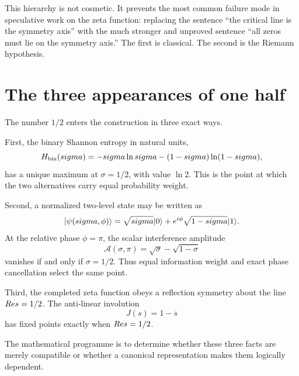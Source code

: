 This hierarchy is not cosmetic. It prevents the most common failure mode in speculative work on the zeta function: replacing the sentence ``the critical line is the symmetry axis'' with the much stronger and unproved sentence ``all zeros must lie on the symmetry axis.'' The first is classical. The second is the Riemann hypothesis.

\section{The three appearances of one half}
The number $1/2$ enters the construction in three exact ways.

First, the binary Shannon entropy in natural units,
\begin{equation}
H_{\mathrm{bin}}(sigma)=-sigma\ln sigma-(1-sigma)\ln(1-sigma),
\end{equation}
has a unique maximum at $\sigma=1/2$, with value $\ln2$. This is the point at which the two alternatives carry equal probability weight.

Second, a normalized two-level state may be written as
\begin{equation}
\lvert \psi(sigma,\phi)\rangle
=\sqrt{sigma}\lvert 0\rangle+e^{i\phi}\sqrt{1-sigma}\lvert 1\rangle.
\end{equation}
At the relative phase $\phi=\pi$, the scalar interference amplitude
\begin{equation}
\mathcal A(\sigma,\pi)=\sqrt{\sigma}-\sqrt{1-\sigma}
\end{equation}
vanishes if and only if $\sigma=1/2$. Thus equal information weight and exact phase cancellation select the same point.

Third, the completed zeta function obeys a reflection symmetry about the line $Re s=1/2$. The anti-linear involution
\begin{equation}
J(s)=1-\overline{s}
\end{equation}
has fixed points exactly when $Re s=1/2$.

The mathematical programme is to determine whether these three facts are merely compatible or whether a canonical representation makes them logically dependent.

